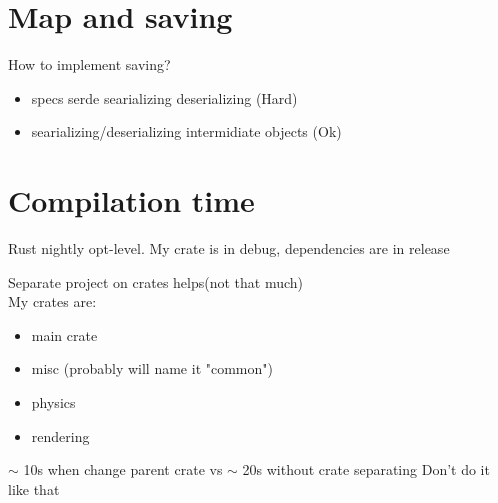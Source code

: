 \documentclass{beamer}
\begin{document}
    \begin{frame}
      \IngameUIExample
    \end{frame}

    \section{Map and saving}
    \begin{frame}
      \centering
      How to implement saving?
      \begin{itemize}
        \item specs serde searializing deserializing (Hard)
        \item searializing/deserializing intermidiate objects (Ok)
      \end{itemize}
    \end{frame}

    \begin{frame}
      \Saving
    \end{frame}

    \begin{frame}
      \RawEntity
    \end{frame}

    \section{Compilation time}
    \begin{frame}
      Rust nightly opt-level. My crate is in debug, dependencies are in release
      \OPTLevels
    \end{frame}

    \begin{frame}
      Separate project on crates helps(not that much)\\
      My crates are:
      \begin{itemize}
        \item main crate
        \item misc (probably will name it "common")
        \item physics
        \item rendering
      \end{itemize}
      $\sim$ 10s when change parent crate vs $\sim$ 20s without crate separating
      Don't do it like that
    \end{frame}
\end{document}
